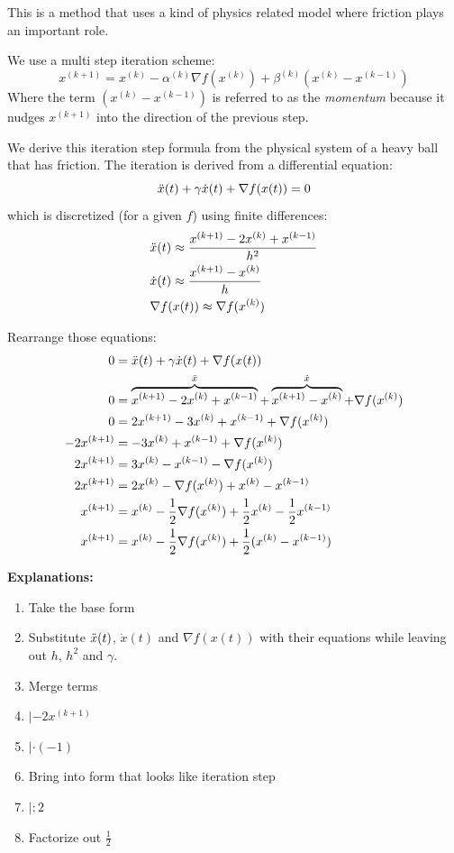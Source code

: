 \documentclass[12pt,a4paper]{article}
\begin{document}
This is a method that uses a kind of physics related model where friction plays an important role.

We use a multi step iteration scheme:
\begin{equation*}
    x^{(k+1)} = x^{(k)} - \alpha^{(k)} \nabla f(x^{(k)}) + \beta^{(k)} (x^{(k)} - x^{(k - 1)})
\end{equation*}
Where the term $(x^{(k)} - x^{(k - 1)})$ is referred to as the \textit{momentum} because it nudges $x^{(k+1)}$ into the direction of the previous step.

We derive this iteration step formula from the physical system of a heavy ball that has friction. The iteration is derived from a differential equation:
\begin{equation*}
    \Ddot{x}(t) + \gamma \Dot{x}(t) + \nabla f(x(t)) = 0
\end{equation*}
which is discretized (for a given $f$) using finite differences:
\begin{align*}
    &\Ddot{x}(t) \approx \frac{x^{(k+1)} - 2x^{(k)} + x^{(k-1)}}{h^2}\\
    &\Dot{x}(t) \approx \frac{x^{(k+1)} - x^{(k)}}{h}\\
    &\nabla f(x(t)) \approx \nabla f(x^{(k)})
\end{align*}

Rearrange those equations:
\begin{align}
    0&=\Ddot{x}(t) + \gamma \Dot{x}(t) + \nabla f(x(t))\\
    0&=\overbrace{x^{(k+1)} - 2x^{(k)} + x^{(k-1)}}^{\Ddot{x}} + \overbrace{x^{(k+1)} - x^{(k)}}^{\Dot{x}} + \nabla f(x^{(k)})\\
    0&=2x^{(k+1)} - 3x^{(k)} + x^{(k-1)} + \nabla f(x^{(k)})\\
    -2x^{(k+1)} &=-3x^{(k)} + x^{(k-1)} + \nabla f(x^{(k)})\\
    2x^{(k+1)} &= 3x^{(k)} - x^{(k-1)} - \nabla f(x^{(k)})\\
    2x^{(k+1)} &= 2x^{(k)} - \nabla f(x^{(k)}) + x^{(k)} - x^{(k-1)}\\
    x^{(k+1)} &= x^{(k)} - \frac{1}{2} \nabla f(x^{(k)}) + \frac{1}{2} x^{(k)} - \frac{1}{2} x^{(k-1)}\\
    x^{(k+1)} &= x^{(k)} - \frac{1}{2} \nabla f(x^{(k)}) + \frac{1}{2}(x^{(k)} - x^{(k-1)})
\end{align}

\textbf{Explanations:}
\begin{enumerate}[(1):]
    \item Take the base form
    \item Substitute $\Ddot{x}(t)$, $\Dot{x}(t)$ and $\nabla f(x(t))$ with their equations while leaving out $h$, $h^2$ and $\gamma$.
    \item Merge terms
    \item $|-2x^{(k+1)}$
    \item $| \cdot (-1)$
    \item Bring into form that looks like iteration step
    \item $|:2$
    \item Factorize out $\frac{1}{2}$
\end{enumerate}
\end{document}
